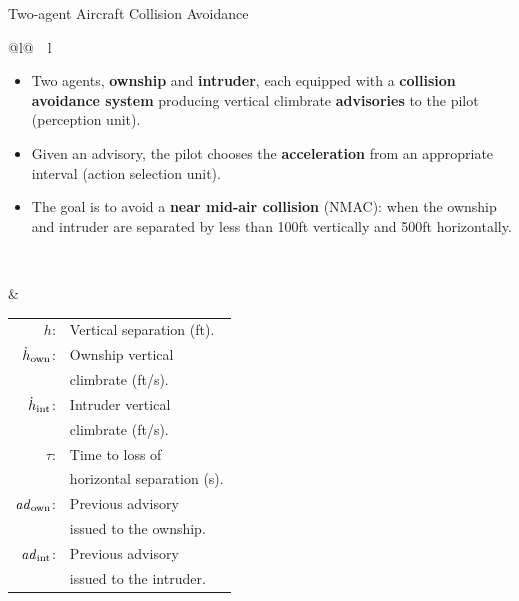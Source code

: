\documentclass[10pt]{beamer}
\begin{document}

\begin{frame}{Two-agent Aircraft Collision Avoidance}

  \small
  
  \hspace{-0.6cm}
  \begin{tabular}{@{}l@{~~}l}
    \begin{minipage}{0.71\linewidth}
      \begin{itemize}\itemsep 0.1cm
      \item Two agents, \textbf{ownship} and \textbf{intruder}, each equipped
        with a \textbf{collision avoidance system} producing vertical climbrate
        \textbf{advisories} to the pilot (perception unit).
      \item Given an advisory, the pilot chooses the
        \textbf{acceleration} from an appropriate interval (action
        selection unit).
      \item The goal is to avoid a \textbf{near mid-air collision}
        (NMAC): when the ownship and intruder are separated
        by less than 100ft vertically and 500ft horizontally.

        ~
      \end{itemize}
    \end{minipage}
    &
      \begin{minipage}{0.25\linewidth}\footnotesize
        \begin{tabular}{@{}r@{~~}l}
          $h$:& Vertical separation (ft).\\
          $\dot{h}_{\text{own}}$:& Ownship vertical\\ &climbrate (ft/s).\\
          $\dot{h}_{\text{int}}$:& Intruder vertical\\ &climbrate (ft/s).\\
          $\tau$:& Time to loss of\\ &horizontal separation (s).\\
          $\mathit{ad}_{\text{own}}$:& Previous advisory\\ &issued to the ownship.\\
          $\mathit{ad}_{\text{int}}$:& Previous advisory\\ &issued to the intruder.
        \end{tabular}
      \end{minipage}
                   
  \end{tabular}


\end{frame}
\end{document}
